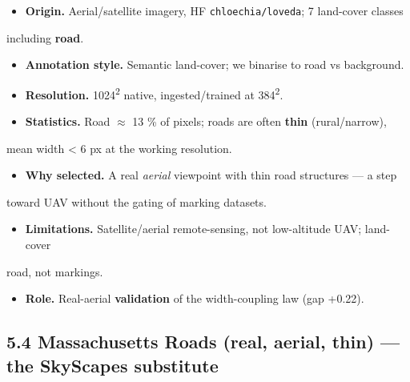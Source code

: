 \documentclass[11pt]{article}
\begin{document}
\begin{itemize}\setlength{\itemsep}{1pt}
\item \textbf{Origin.} Aerial/satellite imagery, HF \texttt{chloechia/loveda}; 7 land-cover classes
\end{itemize}
  including \textbf{road}.
\begin{itemize}\setlength{\itemsep}{1pt}
\item \textbf{Annotation style.} Semantic land-cover; we binarise to road vs background.
\item \textbf{Resolution.} 1024\textsuperscript{2} native, ingested/trained at 384\textsuperscript{2}.
\item \textbf{Statistics.} Road $\approx$ 13 \% of pixels; roads are often \textbf{thin} (rural/narrow),
\end{itemize}
  mean width < 6 px at the working resolution.
\begin{itemize}\setlength{\itemsep}{1pt}
\item \textbf{Why selected.} A real \textit{aerial} viewpoint with thin road structures --- a step
\end{itemize}
  toward UAV without the gating of marking datasets.
\begin{itemize}\setlength{\itemsep}{1pt}
\item \textbf{Limitations.} Satellite/aerial remote-sensing, not low-altitude UAV; land-cover
\end{itemize}
  road, not markings.
\begin{itemize}\setlength{\itemsep}{1pt}
\item \textbf{Role.} Real-aerial \textbf{validation} of the width-coupling law (gap +0.22).
\end{itemize}

\subsection*{5.4 Massachusetts Roads (real, aerial, thin) --- the SkyScapes substitute}
\end{document}
